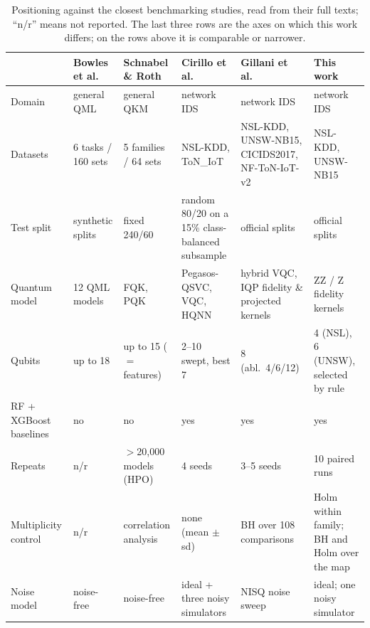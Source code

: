 \begin{table}[t]
\centering
\caption{Positioning against the closest benchmarking studies, read from their full texts;
``n/r'' means not reported. The last three rows are the axes on which this work differs; on
the rows above it is comparable or narrower.}
\label{tab:positioning}
\footnotesize
\setlength{\tabcolsep}{4pt}
\begin{tabular}{@{}l p{2.05cm} p{2.05cm} p{2.05cm} p{2.35cm} p{2.6cm}@{}}
\toprule
 & \textbf{Bowles et al.\ \cite{bowles2024}} & \textbf{Schnabel \& Roth \cite{schnabel2024}} & \textbf{Cirillo et al.\ \cite{qmi2026}} & \textbf{Gillani et al.\ \cite{gillani2026}} & \textbf{This work} \\
\midrule
Domain          & general QML        & general QKM        & network IDS        & network IDS        & network IDS \\
Datasets        & 6 tasks / 160 sets & 5 families / 64 sets & NSL-KDD, ToN\_IoT & NSL-KDD, UNSW-NB15, CICIDS2017, NF-ToN-IoT-v2 & NSL-KDD, UNSW-NB15 \\
Test split      & synthetic splits   & fixed 240/60       & random 80/20 on a 15\% class-balanced subsample & official splits    & official splits \\
Quantum model   & 12 QML models      & FQK, PQK           & Pegasos-QSVC, VQC, HQNN & hybrid VQC, IQP fidelity \& projected kernels & ZZ / Z fidelity kernels \\
Qubits          & up to 18           & up to 15 ($=$ features) & 2--10 swept, best 7 & 8 (abl.\ 4/6/12)   & 4 (NSL), 6 (UNSW), selected by rule \\
RF + XGBoost baselines & no          & no                 & yes                & yes                & yes \\
Repeats         & n/r                & $>$20{,}000 models (HPO) & 4 seeds      & 3--5 seeds         & 10 paired runs \\
Multiplicity control & n/r           & correlation analysis & none (mean $\pm$ sd) & BH over 108 comparisons & Holm within family; BH and Holm over the map \\
Noise model     & noise-free         & noise-free         & ideal + three noisy simulators & NISQ noise sweep & ideal; one noisy simulator \\

\end{tabular}
\end{table}
